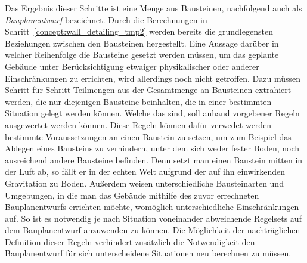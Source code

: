 Das Ergebnis dieser Schritte ist eine Menge aus Bausteinen, nachfolgend auch als \textit{Bauplanentwurf} bezeichnet.
Durch die Berechnungen in Schritt~\ref{concept:wall_detailing_tmp2} werden bereits die grundlegensten Beziehungen zwischen den Bausteinen hergestellt.
Eine Aussage darüber in welcher Reihenfolge die Bausteine gesetzt werden müssen, um das geplante Gebäude unter Berücksichtigung etwaiger physikalischer oder anderer Einschränkungen zu errichten, wird allerdings noch nicht getroffen.
Dazu müssen Schritt für Schritt Teilmengen aus der Gesamtmenge an Bausteinen extrahiert werden, die nur diejenigen Bausteine beinhalten, die in einer bestimmten Situation gelegt werden können.
Welche das sind, soll anhand vorgebener Regeln ausgewertet werden können.
Diese Regeln können dafür verwedet werden bestimmte Voraussetzungen an einen Baustein zu setzen, um zum Beispiel das Ablegen eines Bausteins zu verhindern, unter dem sich weder fester Boden, noch ausreichend andere Bausteine befinden.
Denn setzt man einen Baustein mitten in der Luft ab, so fällt er in der echten Welt aufgrund der auf ihn einwirkenden Gravitation zu Boden.
Außerdem weisen unterschiedliche Bausteinarten und Umgebungen, in die man das Gebäude mithilfe des zuvor errechneten Bauplanentwurfs errichten möchte, womöglich unterschiedliche Einschränkungen auf.
So ist es notwendig je nach Situation voneinander abweichende Regelsets auf dem Bauplanentwurf anzuwenden zu können.
Die Möglichkeit der nachträglichen Definition dieser Regeln verhindert zusätzlich die Notwendigkeit den Bauplanentwurf für sich unterscheidene Situationen neu berechnen zu müssen.

